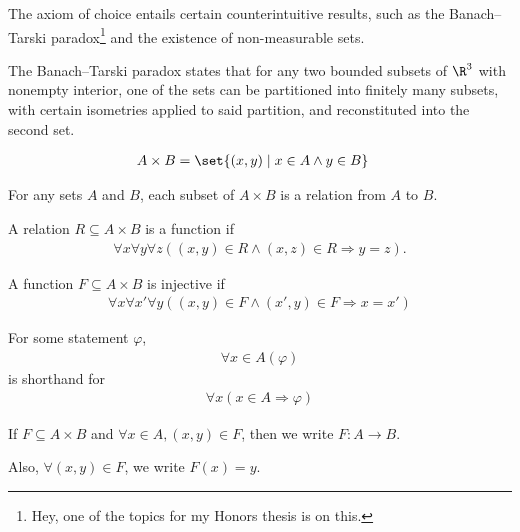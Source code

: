 \documentclass[10pt]{mypackage}
\begin{document}
\begin{remark}
The axiom of choice entails certain counterintuitive results, such as the Banach--Tarski paradox\footnote{Hey, one of the topics for my Honors thesis is on this.} and the existence of non-measurable sets.\newline

The Banach--Tarski paradox states that for any two bounded subsets of $\R^3$ with nonempty interior, one of the sets can be partitioned into finitely many subsets, with certain isometries applied to said partition, and reconstituted into the second set.
\end{remark}
\begin{recall}
  \begin{align*}
    A\times B &= \set{(x,y)\mid x\in A \wedge y\in B}
  \end{align*}
\end{recall}
\begin{definition}
  For any sets $A$ and $B$, each subset of $A\times B$ is a relation from $A$ to $B$.
\end{definition}
\begin{definition}
  A relation $R\subseteq A\times B$ is a function if 
  \begin{align*}
    \forall x \forall y \forall z\left((x,y)\in R \wedge (x,z) \in R \Rightarrow y = z\right).
  \end{align*}
\end{definition}
\begin{definition}
  A function $F\subseteq A\times B$ is injective if
  \begin{align*}
    \forall x \forall x' \forall y \left((x,y)\in F \wedge (x',y)\in F \Rightarrow x=x'\right)
  \end{align*}
\end{definition}
\begin{notation}
  For some statement $\varphi$,
  \begin{align*}
    \forall x\in A \left(\varphi\right)
  \end{align*}
  is shorthand for
  \begin{align*}
    \forall x \left(x\in A \Rightarrow \varphi\right)
  \end{align*}
\end{notation}
\begin{notation}
  If $F\subseteq A\times B$ and $\forall x\in A, (x,y)\in F$, then we write $F: A\rightarrow B$.\newline

  Also, $\forall (x,y)\in F$, we write $F(x) = y$.
\end{notation}
\end{document}
